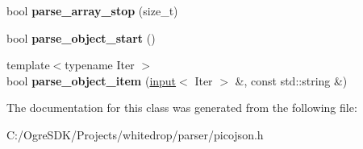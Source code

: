 \begin{DoxyCompactItemize}
\item 
\hypertarget{classpicojson_1_1deny__parse__context_ab284d5b0ee0e8df122d7e842a8d8e0b9}{bool {\bfseries parse\+\_\+array\+\_\+stop} (size\+\_\+t)}\label{classpicojson_1_1deny__parse__context_ab284d5b0ee0e8df122d7e842a8d8e0b9}

\item 
\hypertarget{classpicojson_1_1deny__parse__context_a344343a42dca7a25057e35077e517fbf}{bool {\bfseries parse\+\_\+object\+\_\+start} ()}\label{classpicojson_1_1deny__parse__context_a344343a42dca7a25057e35077e517fbf}

\item 
\hypertarget{classpicojson_1_1deny__parse__context_a08a8add290a938e71285f7b72a24b91c}{{\footnotesize template$<$typename Iter $>$ }\\bool {\bfseries parse\+\_\+object\+\_\+item} (\hyperlink{classpicojson_1_1input}{input}$<$ Iter $>$ \&, const std\+::string \&)}\label{classpicojson_1_1deny__parse__context_a08a8add290a938e71285f7b72a24b91c}

\end{DoxyCompactItemize}


The documentation for this class was generated from the following file\+:\begin{DoxyCompactItemize}
\item 
C\+:/\+Ogre\+S\+D\+K/\+Projects/whitedrop/parser/picojson.\+h\end{DoxyCompactItemize}
